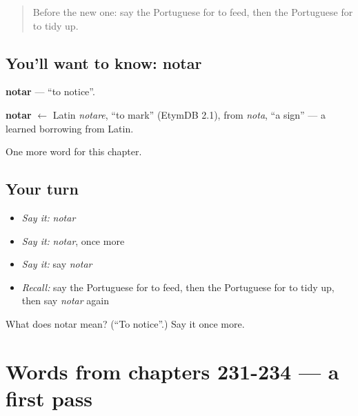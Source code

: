 \label{lesson:PT-C239-notar}



\begin{quote}
Before the new one: say the Portuguese for to feed, then the Portuguese for to tidy up.
\end{quote}

\subsection*{You'll want to know: notar}
\textbf{notar} — \textquotedblleft{}to notice\textquotedblright{}.

\begin{cousinweb}
\textbf{notar} $\leftarrow$ Latin \emph{notare}, \textquotedblleft{}to mark\textquotedblright{} (EtymDB 2.1), from \emph{nota}, \textquotedblleft{}a sign\textquotedblright{} — a learned borrowing from Latin.
\end{cousinweb}

\begin{grammarlens}[title={What you've built}]
One more word for this chapter.
\end{grammarlens}

\subsection*{Your turn}
\begin{itemize}
\raggedright
  \item \emph{Say it:} \emph{notar}
  \item \emph{Say it:} \emph{notar}, once more
  \item \emph{Say it:} say \emph{notar}
  \item \emph{Recall:} say the Portuguese for to feed, then the Portuguese for to tidy up, then say \emph{notar} again
\end{itemize}

\begin{tcolorbox}[breakable,colback=teal!4,colframe=teal!35!black,title={Before you move on}]
What does notar mean? (\textquotedblleft{}To notice\textquotedblright{}.) Say it once more.
\end{tcolorbox}
\section[(dialogue)]{Words from chapters 231-234 — a first pass}

\label{lesson:PT-R239-first-pass-words-from-chapters-231-234}



